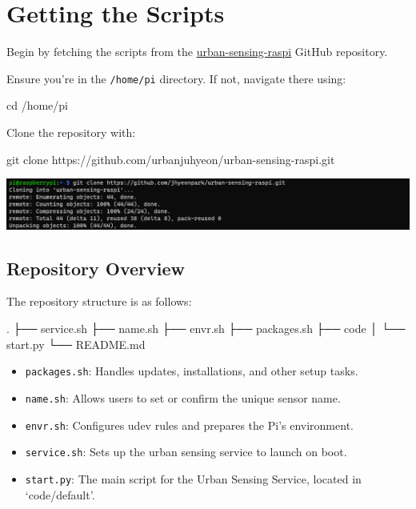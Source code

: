 \documentclass[
  letterpaper,
]{scrbook}
\newenvironment{Shaded}{\begin{snugshade}}{\end{snugshade}}
\newcommand{\BuiltInTok}[1]{\textcolor[rgb]{0.00,0.23,0.31}{#1}}
\newcommand{\ExtensionTok}[1]{\textcolor[rgb]{0.00,0.23,0.31}{#1}}
\newcommand{\FunctionTok}[1]{\textcolor[rgb]{0.28,0.35,0.67}{#1}}
\newcommand{\NormalTok}[1]{\textcolor[rgb]{0.00,0.23,0.31}{#1}}
\providecommand{\tightlist}{%
  \setlength{\itemsep}{0pt}\setlength{\parskip}{0pt}}\usepackage{longtable,booktabs,array}
\begin{document}
\section{Getting the Scripts}\label{getting-the-scripts}

Begin by fetching the scripts from the
\href{https://github.com/urbanjuhyeon/urban-sensing-raspi}{urban-sensing-raspi}
GitHub repository.

Ensure you're in the \texttt{/home/pi} directory. If not, navigate there
using:

\begin{Shaded}
\begin{Highlighting}[]
\BuiltInTok{cd}\NormalTok{ /home/pi}
\end{Highlighting}
\end{Shaded}

Clone the repository with:

\begin{Shaded}
\begin{Highlighting}[]
\FunctionTok{git}\NormalTok{ clone https://github.com/urbanjuhyeon/urban{-}sensing{-}raspi.git}
\end{Highlighting}
\end{Shaded}

\includegraphics{content/material/ch2/clone_raspi.png}

\subsection*{Repository Overview}\label{repository-overview}

The repository structure is as follows:

\begin{Shaded}
\begin{Highlighting}[]
\BuiltInTok{.}
\ExtensionTok{├──}\NormalTok{ service.sh}
\ExtensionTok{├──}\NormalTok{ name.sh}
\ExtensionTok{├──}\NormalTok{ envr.sh}
\ExtensionTok{├──}\NormalTok{ packages.sh}
\ExtensionTok{├──}\NormalTok{ code}
\ExtensionTok{│}\NormalTok{   └── start.py}
\ExtensionTok{└──}\NormalTok{ README.md}
\end{Highlighting}
\end{Shaded}

\begin{itemize}
\tightlist
\item
  \texttt{packages.sh}: Handles updates, installations, and other setup
  tasks.
\item
  \texttt{name.sh}: Allows users to set or confirm the unique sensor
  name.
\item
  \texttt{envr.sh}: Configures udev rules and prepares the Pi's
  environment.
\item
  \texttt{service.sh}: Sets up the urban sensing service to launch on
  boot.
\item
  \texttt{start.py}: The main script for the Urban Sensing Service,
  located in `code/default'.
\end{itemize}
\end{document}
